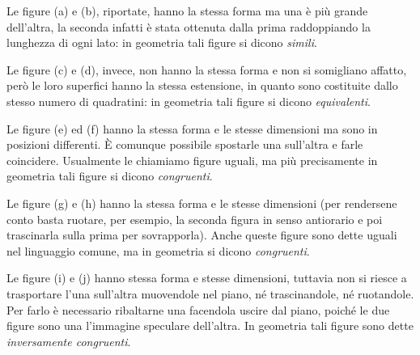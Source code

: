 \begin{inaccessibleblock}
 \begin{figure}[htb]
\centering\qquad\qquad

\end{figure}
\end{inaccessibleblock}

Le figure (a) e (b), riportate, hanno la stessa forma ma una è 
più grande dell'altra, la seconda infatti è stata ottenuta dalla 
prima raddoppiando la lunghezza di ogni lato: in geometria tali 
figure si dicono \emph{simili}.

Le figure (c) e (d), invece, non hanno la stessa forma e non si 
somigliano affatto, però le loro superfici hanno la stessa 
estensione, in quanto sono costituite dallo stesso numero di 
quadratini: in geometria tali figure si dicono \emph{equivalenti}.


\begin{inaccessibleblock}
 \begin{figure}[htb]
\centering\qquad\qquad

\end{figure}
\end{inaccessibleblock}

Le figure (e) ed (f) hanno la stessa forma e le stesse dimensioni ma 
sono in posizioni differenti. \`E comunque possibile spostarle una 
sull'altra e farle coincidere. Usualmente le chiamiamo figure uguali, 
ma più precisamente in geometria tali figure si dicono 
\emph{congruenti}.

Le figure (g) e (h) hanno la stessa forma e le stesse dimensioni (per 
rendersene conto basta ruotare, per esempio, la seconda figura in 
senso antiorario e poi trascinarla sulla prima per sovrapporla). 
Anche queste figure sono dette uguali nel linguaggio comune, ma in 
geometria si dicono \emph{congruenti}.

Le figure (i) e (j) hanno stessa forma e stesse dimensioni, tuttavia 
non si riesce a trasportare l'una sull'altra muovendole nel piano, né 
trascinandole, né ruotandole. Per farlo è necessario ribaltarne una 
facendola uscire dal piano, poiché le due figure sono una l'immagine 
speculare dell'altra. In geometria tali figure sono dette 
\emph{inversamente congruenti}.


\begin{inaccessibleblock}
 \begin{figure}[htb]
\centering\label{fig:figure_i_j}
\end{figure}
\end{inaccessibleblock}

